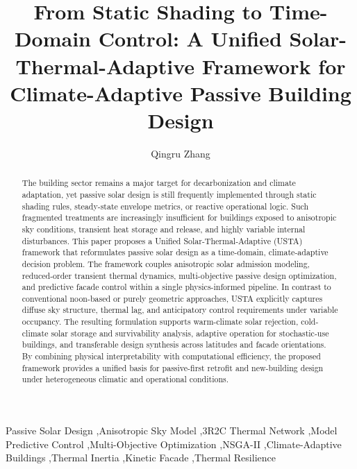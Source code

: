 \documentclass[5p,times,twocolumn]{elsarticle}
\begin{document}
\begin{frontmatter}

\title{From Static Shading to Time-Domain Control: A Unified Solar-Thermal-Adaptive Framework for Climate-Adaptive Passive Building Design}

\author[inst1]{Qingru Zhang}

\begin{abstract}
The building sector remains a major target for decarbonization and climate adaptation, yet passive solar design is still frequently implemented through static shading rules, steady-state envelope metrics, or reactive operational logic. Such fragmented treatments are increasingly insufficient for buildings exposed to anisotropic sky conditions, transient heat storage and release, and highly variable internal disturbances. This paper proposes a Unified Solar-Thermal-Adaptive (USTA) framework that reformulates passive solar design as a time-domain, climate-adaptive decision problem. The framework couples anisotropic solar admission modeling, reduced-order transient thermal dynamics, multi-objective passive design optimization, and predictive facade control within a single physics-informed pipeline. In contrast to conventional noon-based or purely geometric approaches, USTA explicitly captures diffuse sky structure, thermal lag, and anticipatory control requirements under variable occupancy. The resulting formulation supports warm-climate solar rejection, cold-climate solar storage and survivability analysis, adaptive operation for stochastic-use buildings, and transferable design synthesis across latitudes and facade orientations. By combining physical interpretability with computational efficiency, the proposed framework provides a unified basis for passive-first retrofit and new-building design under heterogeneous climatic and operational conditions.
\end{abstract}

\begin{keyword}
Passive Solar Design \sep Anisotropic Sky Model \sep 3R2C Thermal Network \sep Model Predictive Control \sep Multi-Objective Optimization \sep NSGA-II \sep Climate-Adaptive Buildings \sep Thermal Inertia \sep Kinetic Facade \sep Thermal Resilience
\end{keyword}

\end{frontmatter}
\end{document}

